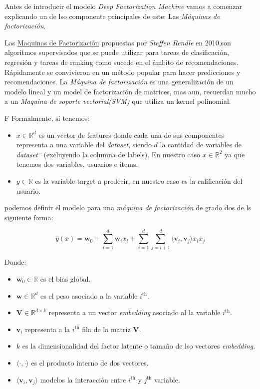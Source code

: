 \documentclass[11pt,a4paper,twoside]{thesis}
\begin{document}
Antes de introducir el modelo \textit{Deep Factorization Machine} vamos a comenzar explicando un de lso componente principales de este: Las \textit{Máquinas de factorización}. 

Las \href{https://www.csie.ntu.edu.tw/~b97053/paper/Rendle2010FM.pdf}{Maquinas de Factorización} propuestas por \textit{Steffen Rendle} en 2010,son algoritmos supervisados que se puede utilizar para tareas de clasificación, regresión y tareas de ranking como sucede en el ámbito de recomendaciones. Rápidamente se convivieron en un método popular para hacer predicciones y recomendaciones. La \textit{Máquina de factorización} es una generalización de un modelo lineal y un model de factorización de matrices, mas aun, recuerdan mucho a un \textit{Maquina de soporte vectorial(SVM)} que utiliza un kernel polinomial.

F
Formalmente, si tenemos:

\begin{itemize}
	\item $x\in\mathbb{R}^{d}$ es un vector de features donde cada una de sus componentes representa a una variable del \textit{dataset}, siendo $d$ la cantidad de variables de \textit{dataset¨} (excluyendo la columna de labels). En nuestro caso $x\in\mathbb{R}^{2}$ ya que tenemos dos variables, usuarios e items.
	\item $y\in\mathbb{R}$ es la variable target a predecir, en nuestro caso es la calificación del usuario. 
\end{itemize}

podemos definir el modelo para una \textit{máquina de factorización} de grado dos de ls siguiente forma:

\begin{equation}
\hat{y}(x) = \mathbf{w}_0 + \sum_{i=1}^d \mathbf{w}_i x_i + \sum_{i=1}^d\sum_{j=i+1}^d \langle\mathbf{v}_i, \mathbf{v}_j\rangle x_i x_j
\end{equation}
\begin{description}
	\item[Donde:]
\end{description}
\begin{itemize}
	\item $\mathbf{w}_0 \in \mathbb{R}$ es el bias global.
	\item $\mathbf{w} \in \mathbb{R}^d$ es el peso asociado a la variable $i^\mathrm{th}$.
	\item $\mathbf{V} \in \mathbb{R}^{d\times k}$ representa a un vector \textit{embedding} asociado al la variable $i^\mathrm{th}$.
	\item $\mathbf{v}_i$ representa a la $i^\mathrm{th}$ fila de la matriz $\mathbf{V}$. 
	\item $k$ es la dimensionalidad del factor latente o tamaño de lso vectores \textit{embedding}.
	\item $\langle\cdot, \cdot \rangle$ es el producto interno de dos vectores.
	\item $\langle \mathbf{v}_i, \mathbf{v}_j \rangle$ modelos la interacción entre $i^\mathrm{th}$ y $j^\mathrm{th}$ variable. 
\end{itemize}
\end{document}
